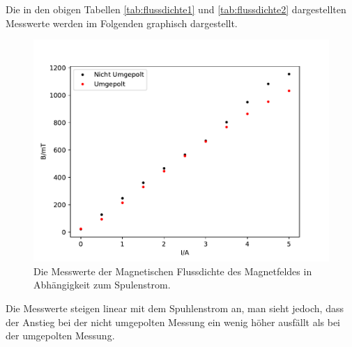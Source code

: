       Die in den obigen Tabellen \ref{tab:flussdichte1} und \ref{tab:flussdichte2} dargestellten Messwerte werden
      im Folgenden graphisch dargestellt.
      \begin{figure}
        \centering
          \includegraphics[width=\textwidth]{auswertung/magnetplot1.pdf}
          \caption{Die Messwerte der Magnetischen Flussdichte des Magnetfeldes in Abhängigkeit zum Spulenstrom.}
          \label{fig:magnet1}
      \end{figure}
      Die Messwerte steigen linear mit dem Spuhlenstrom an, man sieht jedoch, dass der Anstieg bei der nicht umgepolten
      Messung ein wenig höher ausfällt als bei der umgepolten Messung.
  \label{sec:Auswertung}

